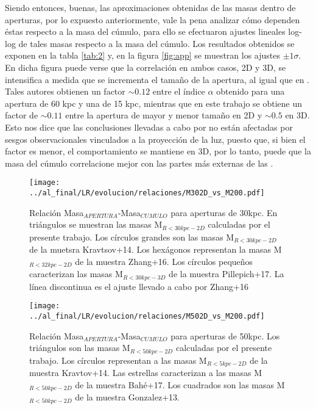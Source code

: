 Siendo entonces, buenas, las aproximaciones obtenidas de las masas dentro de aperturas,
por lo expuesto anteriormente, vale la pena analizar c\'omo dependen \'estas respecto a la masa
del c\'umulo, para ello
se efectuaron ajustes lineales log-log de tales masas respecto a la masa del c\'umulo.
Los resultados obtenidos se exponen en la tabla \ref{tab:2} y, 
en la figura \ref{fig:app} se
muestran los ajustes $\pm1\sigma$. En dicha figura puede verse que la correlaci\'on en ambos casos, 2D y 3D,
se intensifica a medida que se incrementa el tama\~no de la apertura, al igual que en \cite{zha16}.
Tales autores obtienen un factor $\sim 0.12$ entre el \'indice $\alpha$ obtenido para una apertura de 60 kpc
y una de 15 kpc, mientras que en este trabajo se obtiene un factor de $\sim 0.11$ entre
la apertura de mayor y menor tama\~no en 2D y $\sim 0.5$ en 3D.
Esto nos dice que las conclusiones llevadas a cabo por \cite{zha16}
no est\'an afectadas por sesgos observacionales vinculados a la proyecci\'on de la luz,
puesto que, si bien el factor es menor, el comportamiento se mantiene en 3D,
por lo tanto, puede que la masa del c\'umulo correlacione
mejor con las partes m\'as externas de las \bcgs.

\begin{figure}[H]
 \centering
 \texttt{[image: ../al\_final/LR/evolucion/relaciones/M302D\_vs\_M200.pdf]}
\caption{Relaci\'on Masa$_{APERTURA}$-Masa$_{CUMULO}$ para aperturas de 30kpc. En tri\'angulos se muestran las masas M$_{R<30kpc-2D}$ calculadas por el presente trabajo.
Los c\'irculos grandes son las masas M$_{R<30kpc-2D}$ de la muetsra Kravtsov+14. Los hex\'agonos representan la masas M$_{R<32kpc-2D}$ de la muestra
Zhang+16. Los c\'irculos peque\~nos caracterizan las masas M$_{R<30kpc-3D}$ de la muestra Pillepich+17. La l\'inea discontinua es 
el ajuste llevado a cabo por Zhang+16
}
\label{fig:relmtrmc}
\end{figure}


\begin{figure}[H]
 \centering
 \texttt{[image: ../al\_final/LR/evolucion/relaciones/M502D\_vs\_M200.pdf]}
\caption{Relaci\'on Masa$_{APERTURA}$-Masa$_{CUMULO}$ para aperturas de 50kpc. Los tri\'angulos son las masas M$_{R<50kpc-2D}$ calculadas por el presente trabajo.
Los c\'irculos representan a las masas M$_{R<5kpc-2D}$ de la muestra Kravtov+14. Las estrellas caracterizan a las masas M$_{R<50kpc-2D}$ de la muestra Bah\'e+17.
Los cuadrados son las masas M$_{R<50kpc-2D}$ de la muestra Gonzalez+13.}
\label{fig:relmcmc}
\end{figure}




